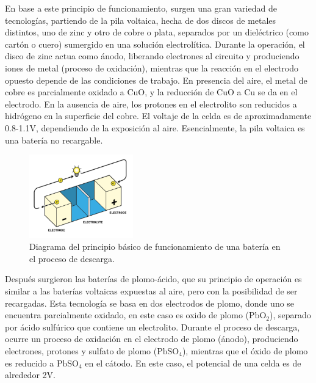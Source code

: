 \documentclass[10pt,a4paper]{article}
\begin{document}
\noindent En base a este principio de funcionamiento, surgen una gran variedad
de tecnologías, partiendo de la pila voltaica, hecha de dos discos de metales
distintos, uno de zinc y otro de cobre o plata, separados por un dieléctrico
(como cartón o cuero) sumergido en una solución electrolítica. Durante la
operación, el disco de zinc actua como ánodo, liberando electrones al circuito y
produciendo iones de metal (proceso de oxidación), mientras que la reacción en
el electrodo opuesto depende de las condiciones de trabajo. En presencia del
aire, el metal de cobre es parcialmente oxidado a CuO, y la reducción de CuO a
Cu se da en el electrodo. En la ausencia de aire, los protones en el electrolito
son reducidos a hidrógeno en la superficie del cobre. El voltaje de la celda es
de aproximadamente 0.8-1.1V, dependiendo de la exposición al aire. 
Esencialmente, la pila voltaica es una batería no recargable.

\begin{figure}[h!]
    \begin{center}
	\includegraphics[width=0.4\textwidth]{batt_func_ppr.png}
    \end{center}
    \caption{Diagrama del principio básico de funcionamiento de una bater\'ia 
        en el proceso de descarga.}
    \label{batt_wk_ppl}
\end{figure}

\noindent Despu\'es surgieron las baterías de plomo-ácido, que su principio
de operaci\'on es similar a las baterías voltaicas expuestas al aire, pero con
la posibilidad de ser recargadas. Esta tecnología se basa en dos electrodos de
plomo, donde uno se encuentra parcialmente oxidado, en este caso es  oxido de 
plomo ($\mathrm{PbO_2}$), separado por \'acido sulf\'urico que contiene un 
electrolito. Durante el proceso de descarga, ocurre un proceso de oxidaci\'on 
en el electrodo de plomo (\'anodo), produciendo electrones, protones y sulfato 
de plomo ($\mathrm{PbSO_4}$), mientras que el \'oxido de plomo es reducido a
$\mathrm{PbSO_4}$ en el cátodo. En este caso, el potencial de una celda es de
alrededor 2V.
\end{document}
